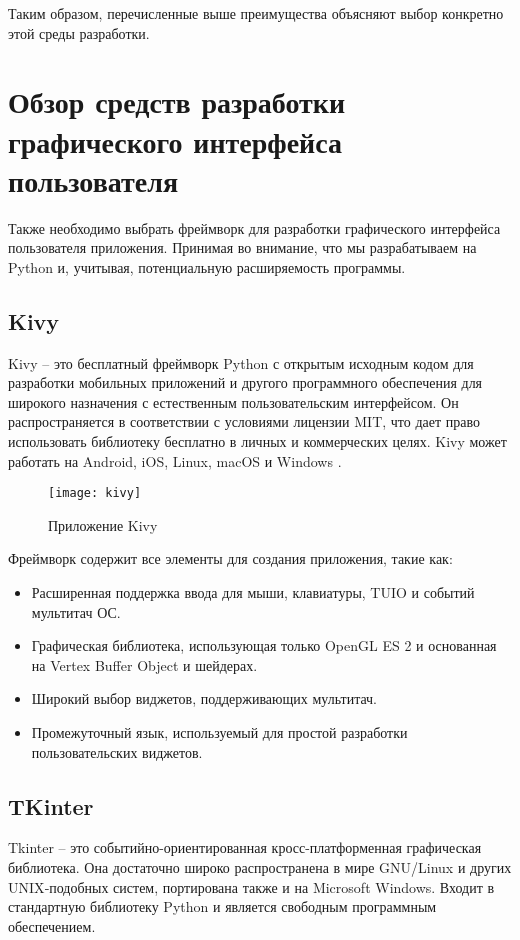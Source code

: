 \documentclass[14pt]{extreport}
\begin{document}
 Таким образом, перечисленные выше преимущества объясняют выбор конкретно этой среды разработки. 

\section{Обзор средств разработки графического интерфейса пользователя}
Также необходимо выбрать фреймворк для разработки графического интерфейса пользователя приложения. Принимая во внимание, что мы разрабатываем на Python и, учитывая, потенциальную расширяемость программы.  

\subsection{Kivy}
Kivy -- это бесплатный фреймворк Python с открытым исходным кодом для разработки мобильных приложений и другого программного обеспечения для  широкого назначения с естественным пользовательским интерфейсом. Он распространяется в соответствии с условиями лицензии MIT, что дает право использовать библиотеку бесплатно в личных и коммерческих целях. Kivy может работать на Android, iOS, Linux, macOS и Windows \cite{kivy}. 

\begin{figure}[H]
	\centerline{\texttt{[image: kivy]}}
	\caption{Приложение Kivy}
	\label{fig13}
\end{figure}

Фреймворк содержит все элементы для создания приложения, такие как:
\begin{itemize}
\item Расширенная поддержка ввода для мыши, клавиатуры, TUIO и событий мультитач ОС.
\item Графическая библиотека, использующая только OpenGL ES 2 и основанная на Vertex Buffer Object и шейдерах.
\item Широкий выбор виджетов, поддерживающих мультитач.
\item Промежуточный язык, используемый для простой разработки пользовательских виджетов.
\end{itemize}

\subsection{TKinter}

Tkinter -- это событийно-ориентированная кросс-платформенная графическая библиотека. Она достаточно широко распространена в мире GNU/Linux и других UNIX‐подобных систем, портирована также и на Microsoft Windows. Входит в стандартную библиотеку Python и является свободным программным обеспечением.
\end{document}
